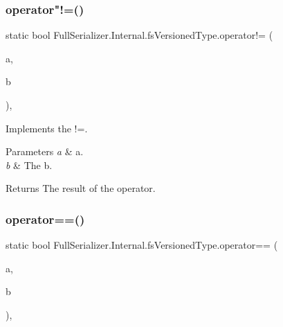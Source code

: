 \subsubsection{\texorpdfstring{operator"!=()}{operator!=()}}
{\footnotesize\ttfamily static bool Full\+Serializer.\+Internal.\+fs\+Versioned\+Type.\+operator!= (\begin{DoxyParamCaption}\item[{\hyperlink{struct_full_serializer_1_1_internal_1_1fs_versioned_type}{fs\+Versioned\+Type}}]{a,  }\item[{\hyperlink{struct_full_serializer_1_1_internal_1_1fs_versioned_type}{fs\+Versioned\+Type}}]{b }\end{DoxyParamCaption})\hspace{0.3cm}{\ttfamily [inline]}, {\ttfamily [static]}}



Implements the !=. 


\begin{DoxyParams}{Parameters}
{\em a} & a.\\
\hline
{\em b} & The b.\\
\hline
\end{DoxyParams}
\begin{DoxyReturn}{Returns}
The result of the operator.
\end{DoxyReturn}
\mbox{\label{struct_full_serializer_1_1_internal_1_1fs_versioned_type_adca4814331ac9692e9e275a0f800343b}} 
\subsubsection{\texorpdfstring{operator==()}{operator==()}}
{\footnotesize\ttfamily static bool Full\+Serializer.\+Internal.\+fs\+Versioned\+Type.\+operator== (\begin{DoxyParamCaption}\item[{\hyperlink{struct_full_serializer_1_1_internal_1_1fs_versioned_type}{fs\+Versioned\+Type}}]{a,  }\item[{\hyperlink{struct_full_serializer_1_1_internal_1_1fs_versioned_type}{fs\+Versioned\+Type}}]{b }\end{DoxyParamCaption})\hspace{0.3cm}{\ttfamily [inline]}, {\ttfamily [static]}}




